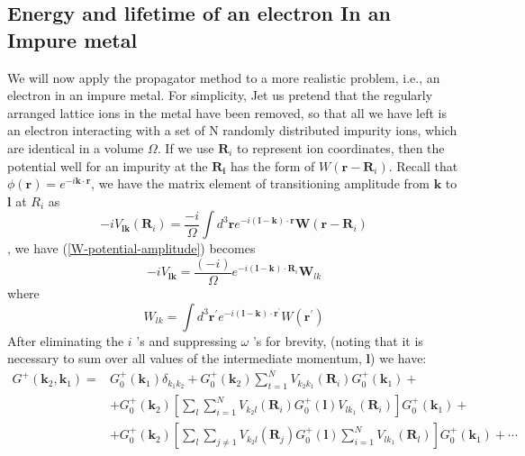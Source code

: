 \subsection{Energy and lifetime of an electron In an Impure metal}
We will now apply the propagator method to a more realistic problem, i.e., an electron in an impure metal. For simplicity, Jet us pretend that the regularly arranged lattice ions in the metal have been removed, so that all we have left is an electron interacting with a set of N randomly distributed impurity ions, which are identical in a volume $\Omega$. If we use $\mathbf{R}_i$ to represent ion coordinates, then the potential well for an impurity at the $\mathbf{R_i}$ has the form of $W(\mathbf{r}-\mathbf{R}_i)$. Recall that $\phi(\mathbf{r})=e^{-i\mathbf{k\cdot r}}$, we have the matrix element of transitioning amplitude from $\mathbf{k}$ to $\mathbf{l}$ at $R_i$ as
\begin{equation}-i V_{\mathbf{lk}}\left(\mathbf{R}_{i}\right)=\frac{-i}{\Omega} \int d^{3} \mathbf{r} e^{-i(\mathbf{l}-\mathbf{k}) \cdot \mathbf{r}} \mathbf{W}\left(\mathbf{r}-\mathbf{R}_{i}\right)
\label{W-potential-amplitude}
\end{equation}
, we have (\ref{W-potential-amplitude}) becomes
\begin{equation}
    -iV_{\mathbf{lk}}=\frac{(-i)}{\Omega} e^{-i(\mathbf{l-k}) \cdot \mathbf{R}_{i}} \mathbf{W}_{l k}
    \label{W-potential-amplitude-2}
\end{equation}
where
$$W_{l k}=\int d^{3} \mathbf{r}^{\prime} e^{-i(\mathbf{l}-\mathbf{k}) \cdot \mathbf{r}^{\prime}} W\left(\mathbf{r}^{\prime}\right)$$
After eliminating the $i$ 's and suppressing $\omega$ 's for brevity, (noting that it is necessary to sum over all values of the intermediate momentum, $\mathbf{l}$) we have:
\begin{equation}\begin{aligned}
G^{+}\left(\mathbf{k}_{2}, \mathbf{k}_{1}\right)=& G_{0}^{+}\left(\mathbf{k}_{1}\right) \delta_{k_{1} k_{2}}+G_{0}^{+}\left(\mathbf{k}_{2}\right) \sum_{t=1}^{N} V_{k_{2} k_{1}}\left(\mathbf{R}_{i}\right) G_{0}^{+}\left(\mathbf{k}_{1}\right)+\\
&+G_{0}^{+}\left(\mathbf{k}_{2}\right)\left[\sum_{l} \sum_{i=1}^{N} V_{k_{2} l}\left(\mathbf{R}_{i}\right) G_{0}^{+}(\mathbf{l}) V_{l k_{1}}\left(\mathbf{R}_{i}\right)\right] G_{0}^{+}\left(\mathbf{k}_{1}\right)+\\
&+G_{0}^{+}\left(\mathbf{k}_{2}\right)\left[\sum_{l} \sum_{j \neq 1} V_{k_{2} l}\left(\mathbf{R}_{j}\right) G_{0}^{+}(\mathbf{l}) \sum_{i=1}^{N} V_{l k_{1}}\left(\mathbf{R}_{l}\right)\right] G_{0}^{+}\left(\mathbf{k}_{1}\right)+\cdots
\end{aligned}
\label{impurity-ion-amp-expansion}
\end{equation}
